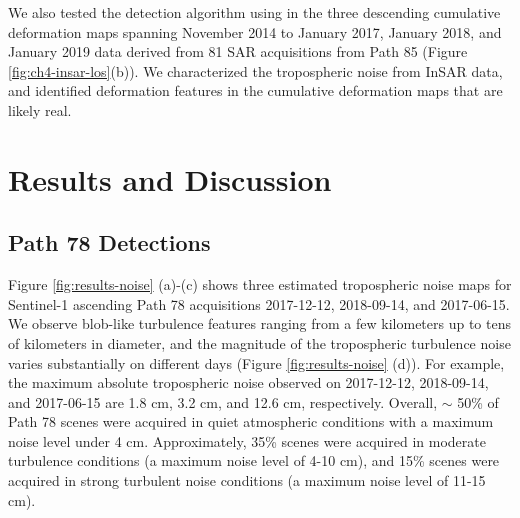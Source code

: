 We also tested the detection algorithm using in the three descending cumulative deformation maps spanning November 2014 to January 2017, January 2018, and January 2019 data derived from 81 SAR acquisitions from Path 85 (Figure \ref{fig:ch4-insar-los}(b)).
We characterized the tropospheric noise from InSAR data, and identified deformation features in the cumulative deformation maps that are likely real.




\section{Results and Discussion}

\subsection{Path 78 Detections}
\label{sec:results:path78}
Figure \ref{fig:results-noise} (a)-(c) shows three estimated tropospheric noise maps for Sentinel-1 ascending Path 78 acquisitions 2017-12-12, 2018-09-14, and 2017-06-15. We observe blob-like turbulence features ranging from a few kilometers up to tens of kilometers in diameter, and the magnitude of the tropospheric turbulence noise varies substantially on different days (Figure \ref{fig:results-noise} (d)). For example, the maximum absolute tropospheric noise observed on 2017-12-12, 2018-09-14, and 2017-06-15 are 1.8 cm, 3.2 cm, and 12.6 cm, respectively. Overall, $\sim$ 50\% of Path 78 scenes were acquired in quiet atmospheric conditions with a maximum noise level under 4 cm. Approximately, 35\% scenes were acquired in moderate turbulence conditions (a maximum noise level of 4-10 cm), and 15\% scenes were acquired in strong turbulent noise conditions (a maximum noise level of 11-15 cm). 

